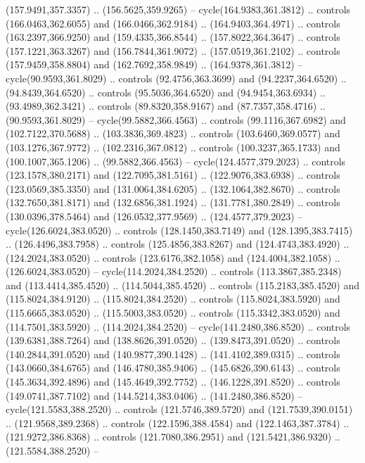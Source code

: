 \begin{scope}[cm={{1.25,0.0,0.0,-1.25,(0.0,743.43331)}}]
    (157.9491,357.3357) .. (156.5625,359.9265) -- cycle(164.9383,361.3812) ..
    controls (166.0463,362.6055) and (166.0466,362.9184) .. (164.9403,364.4971) ..
    controls (163.2397,366.9250) and (159.4335,366.8544) .. (157.8022,364.3647) ..
    controls (157.1221,363.3267) and (156.7844,361.9072) .. (157.0519,361.2102) ..
    controls (157.9459,358.8804) and (162.7692,358.9849) .. (164.9378,361.3812) --
    cycle(90.9593,361.8029) .. controls (92.4756,363.3699) and (94.2237,364.6520)
    .. (94.8439,364.6520) .. controls (95.5036,364.6520) and (94.9454,363.6934) ..
    (93.4989,362.3421) .. controls (89.8320,358.9167) and (87.7357,358.4716) ..
    (90.9593,361.8029) -- cycle(99.5882,366.4563) .. controls (99.1116,367.6982)
    and (102.7122,370.5688) .. (103.3836,369.4823) .. controls (103.6460,369.0577)
    and (103.1276,367.9772) .. (102.2316,367.0812) .. controls (100.3237,365.1733)
    and (100.1007,365.1206) .. (99.5882,366.4563) -- cycle(124.4577,379.2023) ..
    controls (123.1578,380.2171) and (122.7095,381.5161) .. (122.9076,383.6938) ..
    controls (123.0569,385.3350) and (131.0064,384.6205) .. (132.1064,382.8670) ..
    controls (132.7650,381.8171) and (132.6856,381.1924) .. (131.7781,380.2849) ..
    controls (130.0396,378.5464) and (126.0532,377.9569) .. (124.4577,379.2023) --
    cycle(126.6024,383.0520) .. controls (128.1450,383.7149) and
    (128.1395,383.7415) .. (126.4496,383.7958) .. controls (125.4856,383.8267) and
    (124.4743,383.4920) .. (124.2024,383.0520) .. controls (123.6176,382.1058) and
    (124.4004,382.1058) .. (126.6024,383.0520) -- cycle(114.2024,384.2520) ..
    controls (113.3867,385.2348) and (113.4414,385.4520) .. (114.5044,385.4520) ..
    controls (115.2183,385.4520) and (115.8024,384.9120) .. (115.8024,384.2520) ..
    controls (115.8024,383.5920) and (115.6665,383.0520) .. (115.5003,383.0520) ..
    controls (115.3342,383.0520) and (114.7501,383.5920) .. (114.2024,384.2520) --
    cycle(141.2480,386.8520) .. controls (139.6381,388.7264) and
    (138.8626,391.0520) .. (139.8473,391.0520) .. controls (140.2844,391.0520) and
    (140.9877,390.1428) .. (141.4102,389.0315) .. controls (143.0660,384.6765) and
    (146.4780,385.9406) .. (145.6826,390.6143) .. controls (145.3634,392.4896) and
    (145.4649,392.7752) .. (146.1228,391.8520) .. controls (149.0741,387.7102) and
    (144.5214,383.0406) .. (141.2480,386.8520) -- cycle(121.5583,388.2520) ..
    controls (121.5746,389.5720) and (121.7539,390.0151) .. (121.9568,389.2368) ..
    controls (122.1596,388.4584) and (122.1463,387.3784) .. (121.9272,386.8368) ..
    controls (121.7080,386.2951) and (121.5421,386.9320) .. (121.5584,388.2520) --

\end{scope}
